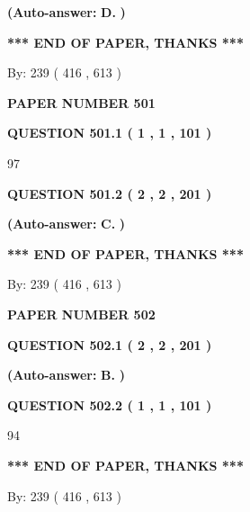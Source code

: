 \documentclass[12pt]{article}
\begin{document}
 
{\textbf{(Auto-answer:}}
{\textbf{\large{
D.}}}
{\textbf{)}}
 
 
   
   
   
   
\vspace{1.0in} 
{\textbf{\large{ *** END OF PAPER, THANKS *** }}} 
   
   
\hspace{1.0in} By: 
 239 ( 416 ,  613 )
   
   
   
   
\newpage 
\setcounter{page}{ 
   501001 } 
   
   
 {\textbf{ \Large{ PAPER NUMBER  501  }}}
   
   
   
   
  
  
{\textbf{\large{QUESTION
501.1 
 ( 1 , 1 , 101 )
}}}

97
  
  
{\textbf{\large{QUESTION
501.2 
 ( 2 , 2 , 201 )
}}}
 
 
{\textbf{(Auto-answer:}}
{\textbf{\large{
C.}}}
{\textbf{)}}
 
 
   
   
   
   
\vspace{1.0in} 
{\textbf{\large{ *** END OF PAPER, THANKS *** }}} 
   
   
\hspace{1.0in} By: 
 239 ( 416 ,  613 )
   
   
   
   
\newpage 
\setcounter{page}{ 
   502001 } 
   
   
 {\textbf{ \Large{ PAPER NUMBER  502  }}}
   
   
   
   
  
  
{\textbf{\large{QUESTION
502.1 
 ( 2 , 2 , 201 )
}}}
 
 
{\textbf{(Auto-answer:}}
{\textbf{\large{
B.}}}
{\textbf{)}}
 
 
  
  
{\textbf{\large{QUESTION
502.2 
 ( 1 , 1 , 101 )
}}}

94
   
   
   
   
\vspace{1.0in} 
{\textbf{\large{ *** END OF PAPER, THANKS *** }}} 
   
   
\hspace{1.0in} By: 
 239 ( 416 ,  613 )
   
   
   
\end{document}
